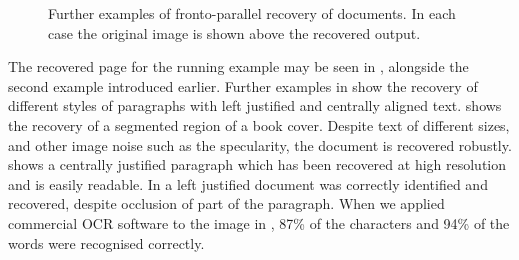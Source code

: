 \begin{figure}[t]
\begin{center}

\end{center}
\vspace*{-3mm}
\caption{Further examples of fronto-parallel recovery of documents. In each case the original image is shown above the recovered output.}
\label{againmoreppresults}
\end{figure}


The recovered page for the running example may be seen in , alongside the second example introduced earlier.
Further examples in 
show the recovery of different styles of paragraphs with left justified and
centrally aligned text.
 shows the recovery of a segmented region of a book cover.  Despite 
text of different sizes, and other image noise such as the specularity, the document is recovered robustly.
 shows a centrally justified paragraph which has been recovered at high resolution and is easily readable.
In  a left justified document was correctly identified and recovered, despite occlusion of part of the paragraph.
When we applied commercial OCR software to the image in , 87\% of the characters and 94\% of the words were recognised correctly.
